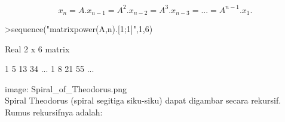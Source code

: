 \documentclass[12pt,arial,letterpaper]{book}
\begin{document}
\begin{eulercomment}
\begin{eulercomment}
\begin{eulercomment}
\begin{eulercomment}
\begin{eulercomment}
\begin{eulercomment}
\begin{eulercomment}
\begin{eulercomment}
\begin{eulercomment}
\begin{eulercomment}
\begin{eulercomment}
\begin{eulercomment}
\begin{eulercomment}
\begin{eulercomment}
\begin{eulercomment}
\begin{eulercomment}
\begin{eulercomment}
\begin{eulercomment}
\begin{eulercomment}
\begin{eulercomment}
\begin{eulercomment}
\begin{eulercomment}
\begin{eulercomment}
\end{eulercomment}
\begin{eulerformula}
\[
x_n=A.x_{n-1}=A^2.x_{n-2}=A^3.x_{n-3}= ... = A^{n-1}.x_1.
\]
\end{eulerformula}
\begin{eulerprompt}
>sequence("matrixpower(A,n).[1;1]",1,6)
\end{eulerprompt}
\begin{euleroutput}
  Real 2 x 6 matrix
  
              1             5            13            34     ...
              1             8            21            55     ...
\end{euleroutput}
\begin{eulercomment}
image: Spiral\_of\_Theodorus.png\\
Spiral Theodorus (spiral segitiga siku-siku) dapat digambar secara
rekursif. Rumus rekursifnya adalah:


\end{eulercomment}
\end{eulercomment}
\end{eulercomment}
\end{eulercomment}
\end{eulercomment}
\end{eulercomment}
\end{eulercomment}
\end{eulercomment}
\end{eulercomment}
\end{eulercomment}
\end{eulercomment}
\end{eulercomment}
\end{eulercomment}
\end{eulercomment}
\end{eulercomment}
\end{eulercomment}
\end{eulercomment}
\end{eulercomment}
\end{eulercomment}
\end{eulercomment}
\end{eulercomment}
\end{eulercomment}
\end{eulercomment}
\end{document}

